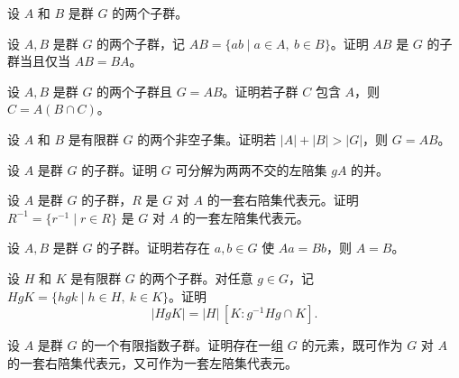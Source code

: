 \newpage
\noindent\begin{minipage}{\textwidth}
设 $A$ 和 $B$ 是群 $G$ 的两个子群。
\end{minipage}\par\vfill
\noindent\begin{minipage}{\textwidth}
设 $A,B$ 是群 $G$ 的两个子群，记 $AB=\{ab\mid a\in A,\ b\in B\}$。证明 $AB$ 是 $G$ 的子群当且仅当 $AB=BA$。
\end{minipage}\par\vfill
\noindent\begin{minipage}{\textwidth}
设 $A,B$ 是群 $G$ 的两个子群且 $G=AB$。证明若子群 $C$ 包含 $A$，则 $C=A(B\cap C)$。
\end{minipage}\par\vfill
\newpage
\noindent\begin{minipage}{\textwidth}
设 $A$ 和 $B$ 是有限群 $G$ 的两个非空子集。证明若 $|A|+|B|>|G|$，则 $G=AB$。
\end{minipage}\par\vfill
\noindent\begin{minipage}{\textwidth}
设 $A$ 是群 $G$ 的子群。证明 $G$ 可分解为两两不交的左陪集 $gA$ 的并。
\end{minipage}\par\vfill
\noindent\begin{minipage}{\textwidth}
设 $A$ 是群 $G$ 的子群，$R$ 是 $G$ 对 $A$ 的一套右陪集代表元。证明 $R^{-1}=\{r^{-1}\mid r\in R\}$ 是 $G$ 对 $A$ 的一套左陪集代表元。
\end{minipage}\par\vfill
\newpage
\noindent\begin{minipage}{\textwidth}
设 $A,B$ 是群 $G$ 的子群。证明若存在 $a,b\in G$ 使 $Aa=Bb$，则 $A=B$。
\end{minipage}\par\vfill
\noindent\begin{minipage}{\textwidth}
设 $H$ 和 $K$ 是有限群 $G$ 的两个子群。对任意 $g\in G$，记 $HgK=\{hgk\mid h\in H,\ k\in K\}$。证明
\[
|HgK|=|H|\,[K:g^{-1}Hg\cap K].
\]
\end{minipage}\par\vfill
\noindent\begin{minipage}{\textwidth}
设 $A$ 是群 $G$ 的一个有限指数子群。证明存在一组 $G$ 的元素，既可作为 $G$ 对 $A$ 的一套右陪集代表元，又可作为一套左陪集代表元。
\end{minipage}\par\vfill
